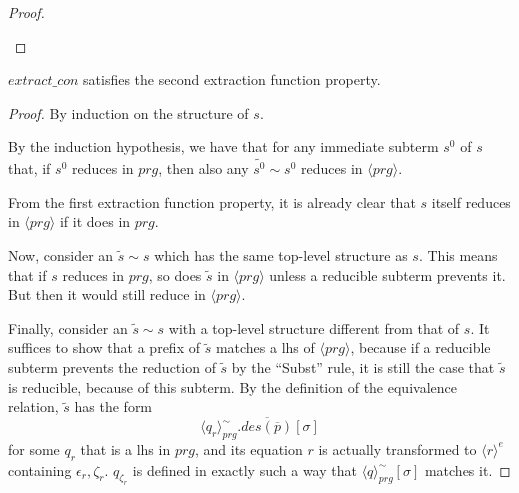 \begin{lemma}
\begin{proof}
\begin{enumerate}
\end{enumerate}

\end{proof}

\end{lemma}

\begin{lemma}

$extract\_con$ satisfies the second extraction function property.

\begin{proof}

By induction on the structure of $s$.

By the induction hypothesis, we have that for any immediate subterm $s^0$ of $s$ that, if $s^0$ reduces in $prg$, then also any $\widetilde{s^0} \sim s^0$ reduces in $\langle prg \rangle$.

From the first extraction function property, it is already clear that $s$ itself reduces in $\langle prg \rangle$ if it does in $prg$.

Now, consider an $\widetilde{s} \sim s$ which has the same top-level structure as $s$. This means that if $s$ reduces in $prg$, so does $\widetilde{s}$ in $\langle prg \rangle$ unless a reducible subterm prevents it. But then it would still reduce in $\langle prg \rangle$.

Finally, consider an $\widetilde{s} \sim s$ with a top-level structure different from that of $s$. It suffices to show that a prefix of $\widetilde{s}$ matches a lhs of $\langle prg \rangle$, because if a reducible subterm prevents the reduction of $\widetilde{s}$ by the ``Subst'' rule, it is still the case that $\widetilde{s}$ is reducible, because of this subterm. By the definition of the equivalence relation, $\widetilde{s}$ has the form
\begin{equation*}
\langle q_r \rangle^{\sim}_{prg}.\overline{des(\overline{p})}[\sigma]
\end{equation*}
for some $q_r$ that is a lhs in $prg$, and its equation $r$ is actually transformed to $\langle r \rangle^e$ containing $\epsilon_r, \zeta_r$. $q_{\zeta_r}$ is defined in exactly such a way that $\langle q \rangle^{\sim}_{prg}[\sigma]$ matches it.

\end{proof}

\end{lemma}


